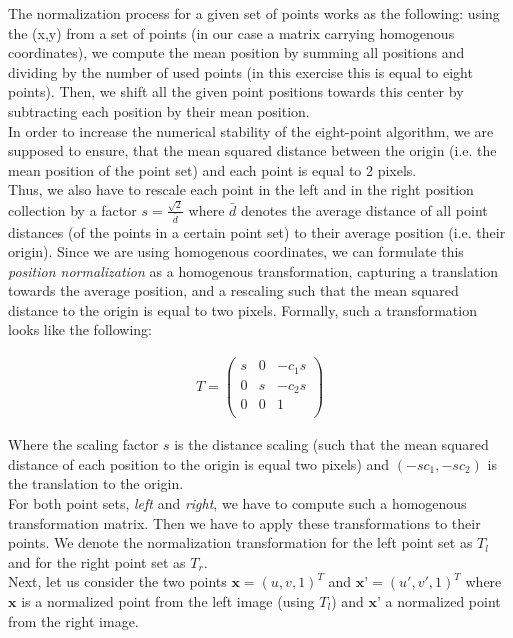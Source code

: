 \documentclass{paper}
\begin{document}
The normalization process for a given set of points works as the following: using the (x,y) from a set of points (in our case a matrix carrying homogenous coordinates), we compute the mean position by summing all positions and dividing by the number of used points (in this exercise this is equal to eight points). Then, we shift all the given point positions towards this center by subtracting each position by their mean position. \\

In order to increase the numerical stability of the eight-point algorithm, we are supposed to ensure, that the mean squared distance between the origin (i.e. the mean position of the point set) and each point is equal to 2 pixels. \\

Thus, we also have to rescale each point in the left and in the right position collection by a factor $s = \frac{\sqrt{2}}{\bar{d}}$ where $\bar{d}$ denotes the average distance of all point distances (of the points in a certain point set) to their average position (i.e. their origin). Since we are using homogenous coordinates, we can formulate this \emph{position normalization} as a homogenous transformation, capturing a translation towards the average position, and a rescaling such that the mean squared distance to the origin is equal to two pixels. Formally, such a transformation looks like the following:

\begin{align*}
T = \left(\begin{array}{ccc}
s & 0 & -c_1 s \\
0 & s & -c_2 s \\
0 & 0 & 1 \\
\end{array} \right)
\end{align*}


Where the scaling factor $s$ is the distance scaling (such that the mean squared distance of each position to the origin is equal two pixels) and $(-s c_1, -s c_2)$ is the translation to the origin. \\

For both point sets, \emph{left} and \emph{right}, we have to compute such a homogenous transformation matrix. Then we have to apply these transformations to their points. We denote the normalization transformation for the left point set as $T_{l}$ and for the right point set as $T_{r}$. \\

Next, let us consider the two points $\textbf{x} = (u,v,1)^{T}$ and $\textbf{x'} = (u',v',1)^{T}$ where $\textbf{x}$ is a normalized point from the left image (using $T_l$) and $\textbf{x'}$ a normalized point from the right image. \\
\end{document}
